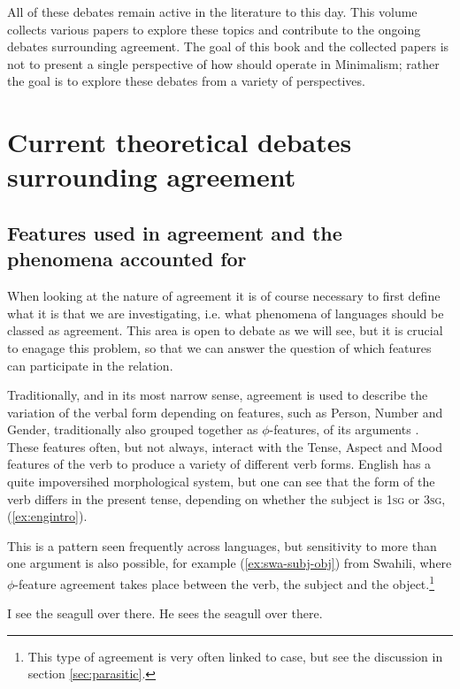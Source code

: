 \documentclass[output=paper
,modfonts
,nonflat]{langsci/langscibook}
\begin{document}
\noindent All of these debates remain active in the literature to this day.
This volume collects various papers to explore these topics and contribute to the ongoing debates surrounding agreement.
The goal of this book and the collected papers is not to present a single perspective of how \agr {} should operate in Minimalism; rather the goal is to explore these debates from a variety of perspectives.

\section{Current theoretical debates surrounding agreement}
\label{seccurrentdebates}

\subsection{Features used in agreement and the phenomena accounted for}
\label{secfeatures}
 
When looking at the nature of agreement it is of course necessary to first define what it is that we are investigating, i.e. what phenomena of languages should be classed as agreement. This area is open to debate as we will see, but it is crucial to enagage this problem, so that we can answer the question of which features can participate in the {\agr} relation.

Traditionally, and in its most narrow sense, agreement is used to describe the variation of the verbal form depending on features, such as Person, Number and Gender, traditionally also grouped together as $\phi$-features, of its arguments \citep{preminger2015}.
These features often, but not always, interact with the Tense, Aspect and Mood features of the verb to produce a variety of different verb forms.
English has a quite impoversihed morphological system, but one can see that the form of the verb differs in the present tense, depending on whether the subject is \textsc{1sg} or \textsc{3sg}, (\ref{ex:engintro}).

This is a pattern seen frequently across languages, but sensitivity to more than one argument is also possible, for example (\ref{ex:swa-subj-obj}) from Swahili, where $\phi$-feature agreement takes place between the verb, the subject and the object.\footnote{This type of agreement is very often linked to case, but see the discussion in section \ref{sec:parasitic}.}
\begin{exe}
	\ex \label{ex:engintro}
	\begin{xlist}
		\ex I see the seagull over there.
		\ex He sees the seagull over there.
	\end{xlist}
\end{exe}
\end{document}

